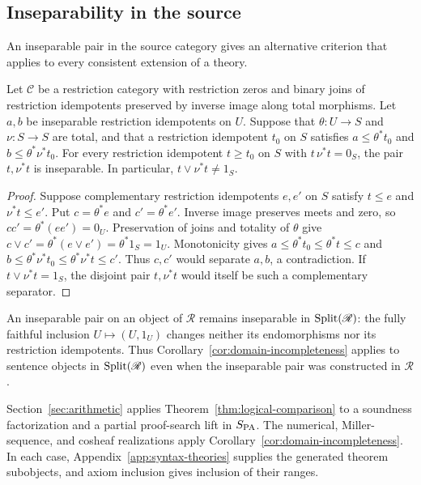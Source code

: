 \subsection{Inseparability in the source}

An inseparable pair in the source category gives an alternative
criterion that applies to every consistent extension of a theory.

\begin{corollary}\label{cor:domain-incompleteness}
Let $\mathcal C$ be a restriction category with restriction zeros and
binary joins of restriction idempotents preserved by inverse image along total morphisms.
Let $a,b$ be inseparable restriction idempotents on $U$. Suppose that
$\theta:U\to S$ and $\nu:S\to S$ are total, and that a restriction
idempotent $t_0$ on $S$ satisfies $a\le\theta^*t_0$ and
$b\le\theta^*\nu^*t_0$.
For every restriction idempotent $t\ge t_0$ on $S$ with $t\,\nu^*t=0_S$,
the pair $t,\nu^*t$ is inseparable. In particular,
$t\vee\nu^*t\ne1_S$.
\end{corollary}
\begin{proof}
Suppose complementary restriction idempotents $e,e'$ on $S$ satisfy
$t\le e$ and $\nu^*t\le e'$. Put
$c=\theta^*e$ and $c'=\theta^*e'$. Inverse image preserves
meets and zero, so $cc'=\theta^*(ee')=0_U$.
Preservation of joins and totality of $\theta$ give
$c\vee c'=\theta^*(e\vee e')=\theta^*1_S=1_U$.
Monotonicity gives
$a\le\theta^*t_0\le\theta^*t\le c$ and
$b\le\theta^*\nu^*t_0\le\theta^*\nu^*t\le c'$.
Thus $c,c'$ would separate $a,b$, a contradiction.
If $t\vee\nu^*t=1_S$, the disjoint pair $t,\nu^*t$ would
itself be such a complementary separator.
\end{proof}

An inseparable pair on an object of $\mathscr R$ remains inseparable
in $\operatorname{Split}(\mathscr R)$: the fully faithful inclusion
$U\mapsto(U,1_U)$ changes neither its endomorphisms nor its
restriction idempotents. Thus
Corollary~\ref{cor:domain-incompleteness} applies to sentence
objects in $\operatorname{Split}(\mathscr R)$ even when the inseparable pair was
constructed in $\mathscr R$.

Section~\ref{sec:arithmetic} applies
Theorem~\ref{thm:logical-comparison} to a soundness factorization
and a partial proof-search lift in $S_{\mathrm{PA}}$.
The numerical, Miller-sequence, and cosheaf realizations apply
Corollary~\ref{cor:domain-incompleteness}. In each case,
Appendix~\ref{app:syntax-theories} supplies the generated theorem
subobjects, and axiom inclusion gives inclusion of their ranges.
